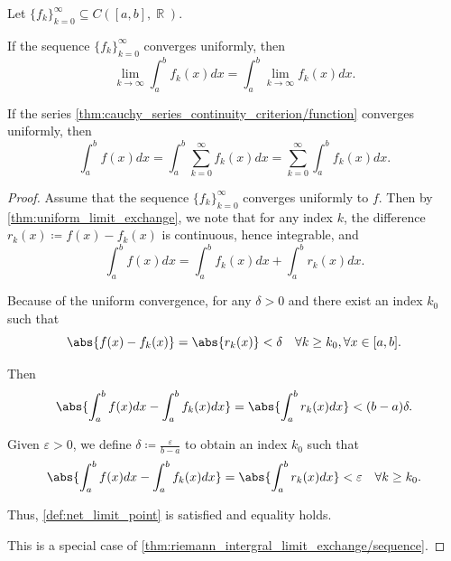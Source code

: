\begin{corollary}\label{thm:riemann_intergral_limit_exchange}
  Let \( \{ f_k \}_{k=0}^\infty \subseteq C([a, b], \BbbR) \).

  \begin{thmenum}
     If the sequence \( \{ f_k \}_{k=0}^\infty \) converges uniformly, then
    \begin{equation*}
      \lim_{k \to \infty} \int_a^b f_k(x) dx = \int_a^b \lim_{k \to \infty} f_k(x) dx.
    \end{equation*}

     If the series \cref{thm:cauchy_series_continuity_criterion/function} converges uniformly, then
    \begin{equation*}
      \int_a^b f(x) dx = \int_a^b \sum_{k=0}^\infty f_k(x) dx = \sum_{k=0}^\infty \int_a^b f_k(x) dx.
    \end{equation*}
  \end{thmenum}
\end{corollary}
\begin{proof}
   Assume that the sequence \( \{ f_k \}_{k=0}^\infty \) converges uniformly to \( f \). Then by \cref{thm:uniform_limit_exchange}, we note that for any index \( k \), the difference \( r_k(x) \coloneqq f(x) - f_k(x) \) is continuous, hence integrable, and
  \begin{equation*}
    \int_a^b f(x) dx = \int_a^b f_k(x) dx + \int_a^b r_k(x) dx.
  \end{equation*}

  Because of the uniform convergence, for any \( \delta > 0 \) and there exist an index \( k_0 \) such that
  \begin{equation*}
    \abs{f(x) - f_k(x)} = \abs{r_k(x)} < \delta \quad\forall k \geq k_0, \forall x \in [a, b].
  \end{equation*}

  Then
  \begin{equation*}
    \abs{\int_a^b f(x) dx - \int_a^b f_k(x) dx} = \abs{\int_a^b r_k(x) dx} < (b - a) \delta.
  \end{equation*}

  Given \( \varepsilon > 0 \), we define \( \delta \coloneqq \frac \varepsilon {b - a} \) to obtain an index \( k_0 \) such that
  \begin{equation*}
    \abs{\int_a^b f(x) dx - \int_a^b f_k(x) dx} = \abs{\int_a^b r_k(x) dx} < \varepsilon \quad\forall k \geq k_0.
  \end{equation*}

  Thus, \cref{def:net_limit_point} is satisfied and equality holds.

   This is a special case of \cref{thm:riemann_intergral_limit_exchange/sequence}.
\end{proof}

